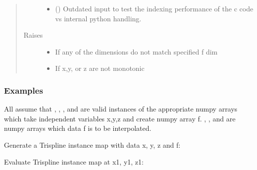 \documentclass[letterpaper,10pt,english]{sphinxmanual}
\begin{document}
\begin{fulllineitems}
\begin{quote}
\begin{description}
\begin{itemize}
\item {} 
 () \textendash{} Outdated input to test the indexing performance of the
c code vs internal python handling.

\end{itemize}

\item[{Raises}] \leavevmode\begin{itemize}
\item {} 
 \textendash{} If any of the dimensions do not match specified f dim

\item {} 
 \textendash{} If x,y, or z are not monotonic

\end{itemize}

\end{description}\end{quote}
\subsubsection*{Examples}

All assume that , , , and  are valid instances of the appropriate
numpy arrays which take independent variables x,y,z and create numpy array
f. , , and  are numpy arrays which data f is to be interpolated.

Generate a Trispline instance map with data x, y, z and f:

\begin{sphinxVerbatim}[commandchars=\\\{\}]
     
\end{sphinxVerbatim}

Evaluate Trispline instance map at x1, y1, z1:

\begin{sphinxVerbatim}[commandchars=\\\{\}]
    
\end{sphinxVerbatim}


\end{fulllineitems}
\end{document}
